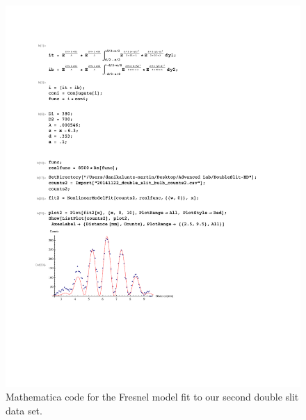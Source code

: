 \documentclass[prb,preprint]{revtex4-1}
\begin{document}
\begin{figure}[h!]
\centering
\includegraphics[width=6in]{DoubleSlitFresnel2.pdf}
\caption{Mathematica code for the Fresnel model fit to our second double slit data set.}
\label{DoubleSlitFresnel2}
\end{figure}
\end{document}
